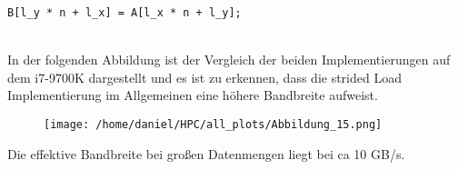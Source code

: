 \documentclass[sigconf,language=english]{acmart}
\begin{document}
\begin{verbatim}
B[l_y * n + l_x] = A[l_x * n + l_y];
\end{verbatim}
\,\\
In der folgenden Abbildung ist der Vergleich der beiden Implementierungen auf dem i7-9700K dargestellt und 
es ist zu erkennen, dass die strided Load Implementierung im Allgemeinen eine höhere Bandbreite aufweist.
\begin{figure}[h]
    \hspace{-0.46cm} %
    \texttt{[image: /home/daniel/HPC/all\_plots/Abbildung\_15.png]}
    \caption{}
    \label{fig:mein_bild}
\end{figure}

Die effektive Bandbreite bei großen Datenmengen liegt bei ca 10 GB/s.






\begin{acks}

\end{acks}





\appendix
\end{document}
